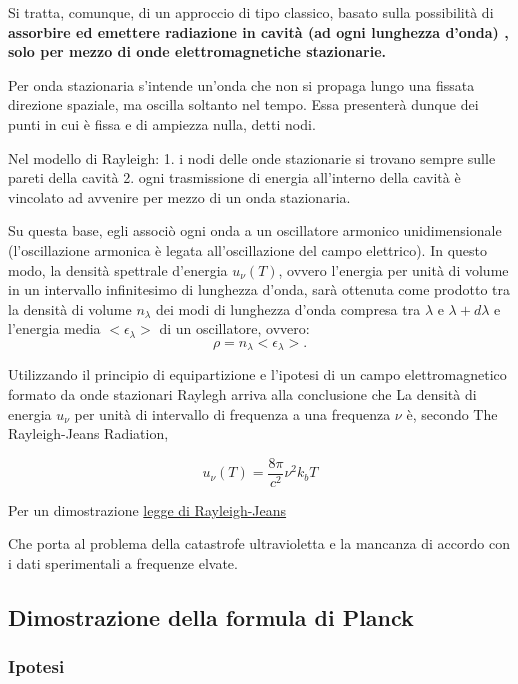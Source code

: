 \documentclass[11pt]{article}
\begin{document}
Si tratta, comunque, di un approccio di tipo classico, basato sulla
possibilità di \textbf{assorbire ed emettere radiazione in cavità (ad
ogni lunghezza d'onda) , solo per mezzo di onde elettromagnetiche
stazionarie.}

Per onda stazionaria s'intende un'onda che non si propaga lungo una
fissata direzione spaziale, ma oscilla soltanto nel tempo. Essa
presenterà dunque dei punti in cui è fissa e di ampiezza nulla, detti
nodi.

Nel modello di Rayleigh: 1. i nodi delle onde stazionarie si trovano
sempre sulle pareti della cavità 2. ogni trasmissione di energia
all'interno della cavità è vincolato ad avvenire per mezzo di un onda
stazionaria.

Su questa base, egli associò ogni onda a un oscillatore armonico
unidimensionale (l'oscillazione armonica è legata all'oscillazione del
campo elettrico). In questo modo, la densità spettrale d'energia
\(u_\nu(T)\), ovvero l'energia per unità di volume in un intervallo
infinitesimo di lunghezza d'onda, sarà ottenuta come prodotto tra la
densità di volume \(n_\lambda\) dei modi di lunghezza d'onda compresa
tra \(\lambda\) e \(\lambda+d\lambda\) e l'energia media
\(<\epsilon_\lambda>\) di un oscillatore, ovvero: \[
\rho=n_\lambda<\epsilon_\lambda>.
\]

Utilizzando il principio di equipartizione e l'ipotesi di un campo
elettromagnetico formato da onde stazionari Raylegh arriva alla
conclusione che La densità di energia \(u_\nu\) per unità di intervallo
di frequenza a una frequenza \(\nu\) è, secondo The Rayleigh-Jeans
Radiation,

\[
u_\nu(T) = \frac{8\pi}{c^2}\nu^2k_bT
\]

Per un dimostrazione
\href{https://github.com/massimobosetti/Physics-Problem/blob/master/5_anno/5.3\%20Crisi\%20della\%20fisica\%20classica/5.3.6.2\%20Derivazione\%20della\%20legge\%20di\%20Rayleigh-Jeans.ipynb}{legge
di Rayleigh-Jeans}

Che porta al problema della catastrofe ultravioletta e la mancanza di
accordo con i dati sperimentali a frequenze elvate.

    \hypertarget{dimostrazione-della-formula-di-planck}{%
\subsection{Dimostrazione della formula di
Planck}\label{dimostrazione-della-formula-di-planck}}

\hypertarget{ipotesi}{%
\subsubsection{Ipotesi}\label{ipotesi}}
\end{document}
